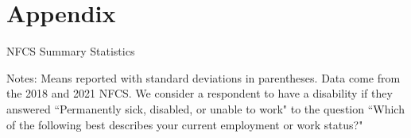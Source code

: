 \documentclass[12pt]{article}
\begin{document}



\section*{Appendix}




\begin{table}[!h]
\caption{NFCS Summary Statistics}
\label{NFCS_Summstats}
 
 \medskip 
\begin{minipage}{0.8\textwidth} 
{\footnotesize Notes: Means reported with standard deviations in parentheses. Data come from the 2018 and 2021 NFCS. We consider a respondent to have a disability if they answered ``Permanently sick, disabled, or unable to work" to the question ``Which of the following best describes your current employment or work status?" \par}
\end{minipage}
\end{table} 
\end{document}
